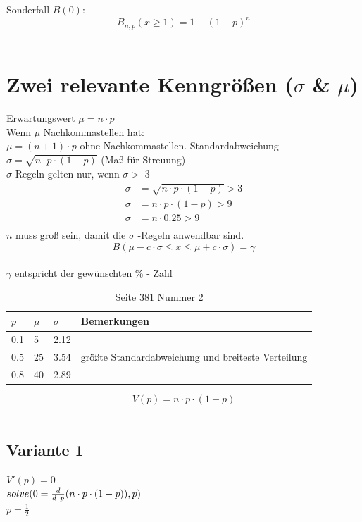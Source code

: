 \documentclass[a4paper,12pt]{article}
\begin{document}
Sonderfall $B(0)$:\\
$$B_{n,p}(x \geq 1) = 1 - (1 - p)^{n}$$\\

\pagebreak
\section*{Zwei relevante Kenngrößen ($\sigma$ \& $\mu$)}
Erwartungswert $\mu = n \cdot p$\\
Wenn $\mu$ Nachkommastellen hat:\\
$\mu = (n + 1) \cdot p$ ohne Nachkommastellen.
Standardabweichung $\sigma = \sqrt{n \cdot p \cdot (1 - p)}$ (Maß für Streuung)\\
$\sigma$-Regeln gelten nur, wenn $\sigma >$ 3\\
\begin{equation*}
\begin{split}
\sigma & = \sqrt{n \cdot p \cdot (1 - p)} > 3\\
\sigma & = n \cdot p \cdot (1 - p) > 9\\
\sigma & = n \cdot 0.25 > 9\\
\end{split}
\end{equation*}
$n$ muss groß sein, damit die $\sigma$ -Regeln anwendbar sind.\\
$$B(\mu - c \cdot \sigma \leq x \leq \mu + c \cdot \sigma) = \gamma$$\\
$\gamma$ entspricht der gewünschten \% - Zahl\\
\begin{table}[h!]
  \begin{center}
    \caption{Seite 381 Nummer 2}
    \label{tab:table5}
    \begin{tabular}{l|l|l|l} %
      \textbf{$p$} & \textbf{$\mu$} & \textbf{$\sigma$} & \textbf{Bemerkungen}\\
      \hline
      0.1 & 5 & 2.12 & \\
      \hline
      0.5 & 25 & 3.54 & größte Standardabweichung und breiteste Verteilung\\
      \hline
      0.8 & 40 & 2.89 & \\
    \end{tabular}
  \end{center}
\end{table}
$$V(p) = n \cdot p \cdot (1 - p)$$\\
\pagebreak
\subsection*{Variante 1}
$V'(p) = 0$\\
$solve\large{(}0 = \frac{d}{d\ p} (n \cdot p \cdot (1 - p)),p\large{)}$\\
$p = \frac{1}{2}$\\
\end{document}
